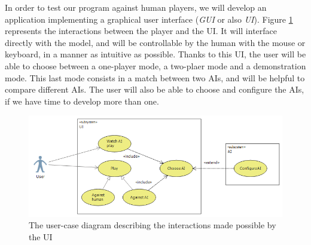 In order to test our program against human players, we will develop an application implementing a graphical user interface (\emph{GUI} or also \emph{UI}).
Figure \ref{fig:UCD_Play} represents the interactions between the player and the UI.
It will interface directly with the model, and will be controllable by the human with the mouse or keyboard, in a manner as intuitive as possible.
Thanks to this UI, the user will be able to choose between a one-player mode, a two-plaer mode and a demonstration mode.
This last mode consists in a match between two AIs, and will be helpful to compare different AIs.
The user will also be able to choose and configure the AIs, if we have time to develop more than one.

\begin{figure}[H]
\centering
\includegraphics[width=\textwidth]{2General_Architecture/2.1Behaviour_of_the_Game/Pictures/Application_UCD}
\caption{The user-case diagram describing the interactions made possible by the UI}
\label{fig:UCD_Play}
\end{figure}